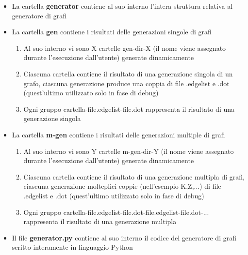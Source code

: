 \begin{itemize}
	\item La cartella \textbf{generator} contiene al suo interno l'intera struttura relativa al generatore di grafi
	\item La cartella \textbf{gen} contiene i risultati delle generazioni singole di grafi
	\begin{enumerate}
		\item Al suo interno vi sono X cartelle gen-dir-X (il nome viene assegnato durante l'esecuzione dall'utente) generate dinamicamente
		\item Ciascuna cartella contiene il risultato di una generazione singola di un grafo, ciascuna generazione produce una coppia di file .edgelist e .dot (quest'ultimo utilizzato solo in fase di debug)
		\item Ogni gruppo cartella-file.edgelist-file.dot rappresenta il risultato di una generazione singola
	\end{enumerate}
	\item La cartella \textbf{m-gen} contiene i risultati delle generazioni multiple di grafi
	\begin{enumerate}
		\item Al suo interno vi sono Y cartelle m-gen-dir-Y (il nome viene assegnato durante l'esecuzione dall'utente) generate dinamicamente
		\item Ciascuna cartella contiene il risultato di una generazione multipla di grafi, ciascuna generazione molteplici coppie (nell'esempio K,Z,...) di file .edgelist e .dot (quest'ultimo utilizzato solo in fase di debug)
		\item Ogni gruppo cartella-file.edgelist-file.dot-file.edgelist-file.dot-... rappresenta il risultato di una generazione multipla
	\end{enumerate}
	\item Il file \textbf{generator.py} contiene al suo interno il codice del generatore di grafi scritto interamente in linguaggio Python
\end{itemize}

